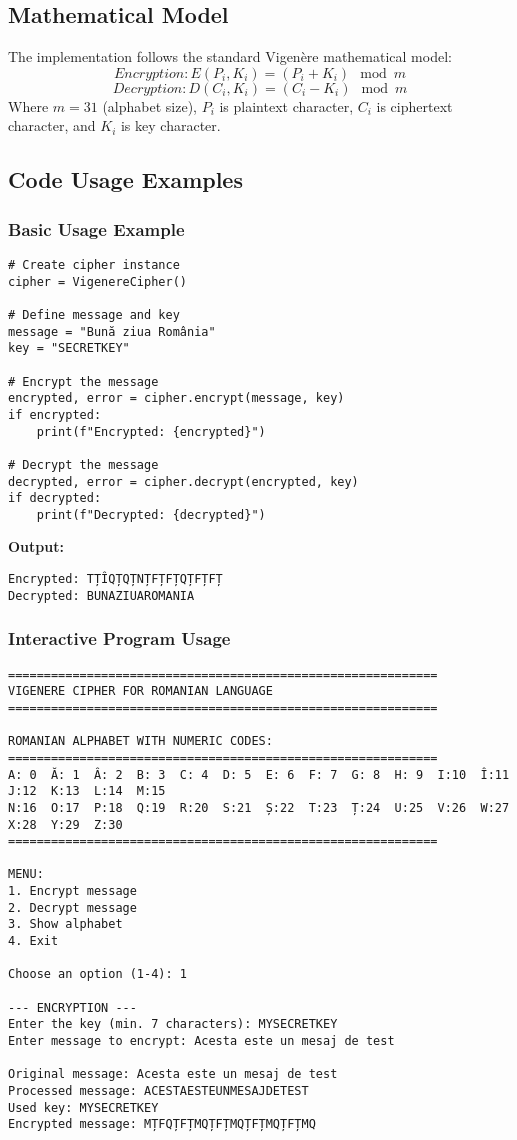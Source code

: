 \documentclass[12pt]{article}
\begin{document}
\subsection*{Mathematical Model}
The implementation follows the standard Vigenère mathematical model:
\[
Encryption: E(P_i, K_i) = (P_i + K_i) \mod m
\]
\[
Decryption: D(C_i, K_i) = (C_i - K_i) \mod m
\]
Where $m = 31$ (alphabet size), $P_i$ is plaintext character, $C_i$ is ciphertext character, and $K_i$ is key character.

\subsection*{Code Usage Examples}

\subsubsection*{Basic Usage Example}
\begin{verbatim}
# Create cipher instance
cipher = VigenereCipher()

# Define message and key
message = "Bună ziua România"
key = "SECRETKEY"

# Encrypt the message
encrypted, error = cipher.encrypt(message, key)
if encrypted:
    print(f"Encrypted: {encrypted}")

# Decrypt the message
decrypted, error = cipher.decrypt(encrypted, key)
if decrypted:
    print(f"Decrypted: {decrypted}")
\end{verbatim}

\textbf{Output:}
\begin{verbatim}
Encrypted: TȚÎQȚQȚNȚFȚFȚQȚFȚFȚ
Decrypted: BUNAZIUAROMANIA
\end{verbatim}

\subsubsection*{Interactive Program Usage}
\begin{verbatim}
============================================================
VIGENERE CIPHER FOR ROMANIAN LANGUAGE
============================================================

ROMANIAN ALPHABET WITH NUMERIC CODES:
============================================================
A: 0  Ă: 1  Â: 2  B: 3  C: 4  D: 5  E: 6  F: 7  G: 8  H: 9  I:10  Î:11  J:12  K:13  L:14  M:15  
N:16  O:17  P:18  Q:19  R:20  S:21  Ș:22  T:23  Ț:24  U:25  V:26  W:27  X:28  Y:29  Z:30  
============================================================

MENU:
1. Encrypt message
2. Decrypt message
3. Show alphabet
4. Exit

Choose an option (1-4): 1

--- ENCRYPTION ---
Enter the key (min. 7 characters): MYSECRETKEY
Enter message to encrypt: Acesta este un mesaj de test

Original message: Acesta este un mesaj de test
Processed message: ACESTAESTEUNMESAJDETEST
Used key: MYSECRETKEY
Encrypted message: MȚFQȚFȚMQȚFȚMQȚFȚMQȚFȚMQ
\end{verbatim}
\end{document}
